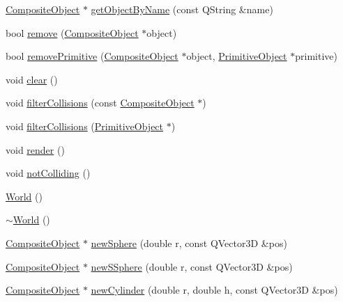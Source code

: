 \begin{DoxyCompactItemize}
\hyperlink{class_robot_model_1_1_composite_object}{CompositeObject} $\ast$ \hyperlink{class_robot_model_1_1_world_a2ccf0c4dd817ecae42edbb82f54289a2}{getObjectByName} (const QString \&name)
\item 
bool \hyperlink{class_robot_model_1_1_world_a40f4e4bfed5121602f993bf561932b07}{remove} (\hyperlink{class_robot_model_1_1_composite_object}{CompositeObject} $\ast$object)
\item 
bool \hyperlink{class_robot_model_1_1_world_a498c5d79bc95bd308680c2a8c5e475b0}{removePrimitive} (\hyperlink{class_robot_model_1_1_composite_object}{CompositeObject} $\ast$object, \hyperlink{class_robot_model_1_1_primitive_object}{PrimitiveObject} $\ast$primitive)
\item 
void \hyperlink{class_robot_model_1_1_world_a24f6906f2e4f0c761653a8f9e42588a6}{clear} ()
\item 
void \hyperlink{class_robot_model_1_1_world_a530cb18d1249f7c6e94c4ba6879cf36a}{filterCollisions} (const \hyperlink{class_robot_model_1_1_composite_object}{CompositeObject} $\ast$)
\item 
void \hyperlink{class_robot_model_1_1_world_a38aea4885454231131d4ccb7945138dc}{filterCollisions} (\hyperlink{class_robot_model_1_1_primitive_object}{PrimitiveObject} $\ast$)
\item 
void \hyperlink{class_robot_model_1_1_world_a150eab10c21532162bb698d72aecec16}{render} ()
\item 
void \hyperlink{class_robot_model_1_1_world_a2300046adaa75a432476dbef1934bb01}{notColliding} ()
\item 
\hyperlink{class_robot_model_1_1_world_a807755fd0da7662eb04f0ba39b0f809b}{World} ()
\item 
\hyperlink{class_robot_model_1_1_world_ae7d888c14117743b3492fb989c7f875b}{$\sim$World} ()
\item 
\hyperlink{class_robot_model_1_1_composite_object}{CompositeObject} $\ast$ \hyperlink{class_robot_model_1_1_world_a5bdceb8e105d9cff94df86e3dd1cd80a}{newSphere} (double r, const QVector3D \&pos)
\item 
\hyperlink{class_robot_model_1_1_composite_object}{CompositeObject} $\ast$ \hyperlink{class_robot_model_1_1_world_a5f65aab98a5d0320b387fe576bc0dc08}{newSSphere} (double r, const QVector3D \&pos)
\item 
\hyperlink{class_robot_model_1_1_composite_object}{CompositeObject} $\ast$ \hyperlink{class_robot_model_1_1_world_aed6d757ee7af4ba8a768f591da8b1397}{newCylinder} (double r, double h, const QVector3D \&pos)
\item 

\end{DoxyCompactItemize}
